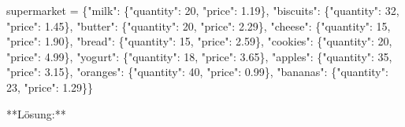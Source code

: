 \documentclass[
  11pt,
  a4paper,
  DIV=11,
  numbers=noendperiod]{scrartcl}
\newenvironment{Shaded}{\begin{snugshade}}{\end{snugshade}}
\newcommand{\DecValTok}[1]{\textcolor[rgb]{0.68,0.00,0.00}{#1}}
\newcommand{\FloatTok}[1]{\textcolor[rgb]{0.68,0.00,0.00}{#1}}
\newcommand{\NormalTok}[1]{\textcolor[rgb]{0.00,0.23,0.31}{#1}}
\newcommand{\OperatorTok}[1]{\textcolor[rgb]{0.37,0.37,0.37}{#1}}
\newcommand{\StringTok}[1]{\textcolor[rgb]{0.13,0.47,0.30}{#1}}
\begin{document}
\begin{Shaded}
\begin{Highlighting}[numbers=left,,]
\NormalTok{supermarket }\OperatorTok{=}\NormalTok{ \{}\StringTok{"milk"}\NormalTok{: \{}\StringTok{"quantity"}\NormalTok{: }\DecValTok{20}\NormalTok{, }\StringTok{"price"}\NormalTok{: }\FloatTok{1.19}\NormalTok{\},}
               \StringTok{"biscuits"}\NormalTok{:  \{}\StringTok{"quantity"}\NormalTok{: }\DecValTok{32}\NormalTok{, }\StringTok{"price"}\NormalTok{: }\FloatTok{1.45}\NormalTok{\},}
               \StringTok{"butter"}\NormalTok{:  \{}\StringTok{"quantity"}\NormalTok{: }\DecValTok{20}\NormalTok{, }\StringTok{"price"}\NormalTok{: }\FloatTok{2.29}\NormalTok{\},}
               \StringTok{"cheese"}\NormalTok{:  \{}\StringTok{"quantity"}\NormalTok{: }\DecValTok{15}\NormalTok{, }\StringTok{"price"}\NormalTok{: }\FloatTok{1.90}\NormalTok{\},}
               \StringTok{"bread"}\NormalTok{:  \{}\StringTok{"quantity"}\NormalTok{: }\DecValTok{15}\NormalTok{, }\StringTok{"price"}\NormalTok{: }\FloatTok{2.59}\NormalTok{\},}
               \StringTok{"cookies"}\NormalTok{:  \{}\StringTok{"quantity"}\NormalTok{: }\DecValTok{20}\NormalTok{, }\StringTok{"price"}\NormalTok{: }\FloatTok{4.99}\NormalTok{\},}
               \StringTok{"yogurt"}\NormalTok{: \{}\StringTok{"quantity"}\NormalTok{: }\DecValTok{18}\NormalTok{, }\StringTok{"price"}\NormalTok{: }\FloatTok{3.65}\NormalTok{\},}
               \StringTok{"apples"}\NormalTok{:  \{}\StringTok{"quantity"}\NormalTok{: }\DecValTok{35}\NormalTok{, }\StringTok{"price"}\NormalTok{: }\FloatTok{3.15}\NormalTok{\},}
               \StringTok{"oranges"}\NormalTok{:  \{}\StringTok{"quantity"}\NormalTok{: }\DecValTok{40}\NormalTok{, }\StringTok{"price"}\NormalTok{: }\FloatTok{0.99}\NormalTok{\},}
               \StringTok{"bananas"}\NormalTok{: \{}\StringTok{"quantity"}\NormalTok{: }\DecValTok{23}\NormalTok{, }\StringTok{"price"}\NormalTok{: }\FloatTok{1.29}\NormalTok{\}\}\textasciigrave{}\textasciigrave{}\textasciigrave{}}

\OperatorTok{**}\NormalTok{Lösung:}\OperatorTok{**}


\end{Highlighting}
\end{Shaded}
\end{document}
